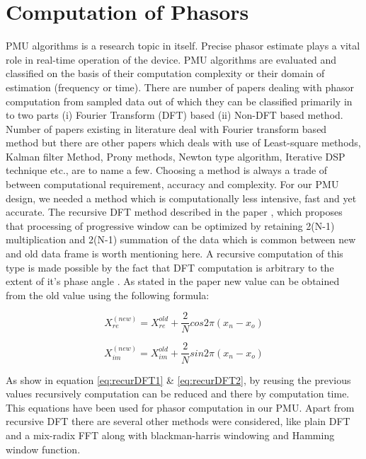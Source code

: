  \section{Computation of Phasors}
 PMU algorithms is a research topic in itself. Precise phasor estimate plays a vital role in real-time operation of the device. PMU algorithms are evaluated and classified on the basis of their computation complexity or their domain of estimation (frequency or time). There are number of papers dealing with phasor computation from sampled data out of which they can be classified primarily in to two parts (i) Fourier Transform (DFT) based (ii) Non-DFT based method. Number of papers existing in literature deal with Fourier transform based method but there are other papers which deals with use of Least-square methods, Kalman filter Method, Prony methods, Newton type algorithm, Iterative DSP technique etc., are to name a few. Choosing a method is always a trade of between computational requirement, accuracy and complexity. For our PMU design, we needed a method which is computationally less intensive, fast and yet accurate. The recursive DFT method described in the paper \cite{phadke1983new}, which proposes that processing of progressive window can be optimized by retaining 2(N-1) multiplication and 2(N-1) summation of the data which is common between new and old data frame is worth mentioning here. A recursive computation of this type is made possible by the fact that DFT computation is arbitrary to the extent of it's phase angle \cite{phadke1983new}. As stated in the paper new value can be obtained from the old value using the following formula:
 
 \begin{equation}
 X_{re}^{(new)} = X_{re}^{old} + \frac{2}{N}cos 2\pi(x_{n} - x_{o})
 \label{eq:recurDFT1}
 \end{equation} 
 
 \begin{equation}
 X_{im}^{(new)} = X_{im}^{old} + \frac{2}{N}sin 2\pi(x_{n} - x_{o})
 \label{eq:recurDFT2}
 \end{equation}
 
 As show in equation \ref{eq:recurDFT1} \& \ref{eq:recurDFT2}, by reusing the previous values recursively computation can be reduced and there by computation time. This equations have been used for phasor computation in our PMU. Apart from recursive DFT there are several other methods were considered, like plain DFT and a mix-radix FFT \cite{kissFFT} along with blackman-harris windowing and Hamming window function. 
 
